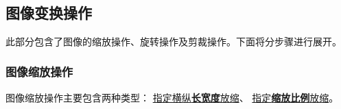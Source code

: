 \documentclass[11pt]{article}
\begin{document}
    \begin{center}
    \end{center}
    { \hspace*{\fill} \\}
    
    
    \subsection{图像变换操作}
    此部分包含了图像的缩放操作、旋转操作及剪裁操作。下面将分步骤进行展开。
    \subsubsection{图像缩放操作}
    图像缩放操作主要包含两种类型：
    	\underline{指定横纵\textbf{长宽度}放缩}、
    	\underline{指定\textbf{缩放比例}放缩}。
\end{document}
